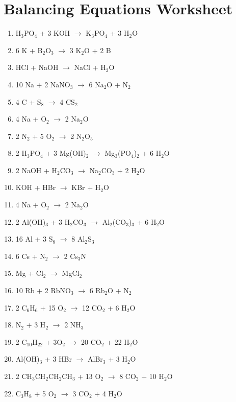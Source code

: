 \documentclass[border=5mm]{standalone}
\begin{document}
\begin{minipage}{\textwidth}

\section*{Balancing Equations Worksheet}

\begin{enumerate}
    \item H$_3$PO$_4$ + 3 KOH $\rightarrow$ K$_3$PO$_4$ + 3 H$_2$O
    \item 6 K + B$_2$O$_3$ $\rightarrow$ 3 K$_2$O + 2 B
    \item HCl + NaOH $\rightarrow$ NaCl + H$_2$O
    \item 10 Na + 2 NaNO$_3$ $\rightarrow$ 6 Na$_2$O + N$_2$
    \item 4 C + S$_8$ $\rightarrow$ 4 CS$_2$
    \item 4 Na + O$_2$ $\rightarrow$ 2 Na$_2$O
    \item 2 N$_2$ + 5 O$_2$ $\rightarrow$ 2 N$_2$O$_5$
    \item 2 H$_3$PO$_4$ + 3 Mg(OH)$_2$ $\rightarrow$ Mg$_3$(PO$_4$)$_2$ + 6 H$_2$O
    \item 2 NaOH + H$_2$CO$_3$ $\rightarrow$ Na$_2$CO$_3$ + 2 H$_2$O
    \item KOH + HBr $\rightarrow$ KBr + H$_2$O
    \item 4 Na + O$_2$ $\rightarrow$ 2 Na$_2$O
    \item 2 Al(OH)$_3$ + 3 H$_2$CO$_3$ $\rightarrow$ Al$_2$(CO$_3$)$_3$ + 6 H$_2$O
    \item 16 Al + 3 S$_8$ $\rightarrow$ 8 Al$_2$S$_3$
    \item 6 Cs + N$_2$ $\rightarrow$ 2 Cs$_3$N
    \item Mg + Cl$_2$ $\rightarrow$ MgCl$_2$
    \item 10 Rb + 2 RbNO$_3$ $\rightarrow$ 6 Rb$_2$O + N$_2$
    \item 2 C$_6$H$_6$ + 15 O$_2$ $\rightarrow$ 12 CO$_2$ + 6 H$_2$O
    \item N$_2$ + 3 H$_2$ $\rightarrow$ 2 NH$_3$
    \item 2 C$_{10}$H$_{22}$ + 3O$_2$ $\rightarrow$ 20 CO$_2$ + 22 H$_2$O
    \item Al(OH)$_3$ + 3 HBr $\rightarrow$ AlBr$_3$ + 3 H$_2$O
    \item 2 CH$_3$CH$_2$CH$_2$CH$_3$ + 13 O$_2$ $\rightarrow$ 8 CO$_2$ + 10 H$_2$O
    \item C$_3$H$_8$ + 5 O$_2$ $\rightarrow$ 3 CO$_2$ + 4 H$_2$O

\end{enumerate}
\end{minipage}
\end{document}
